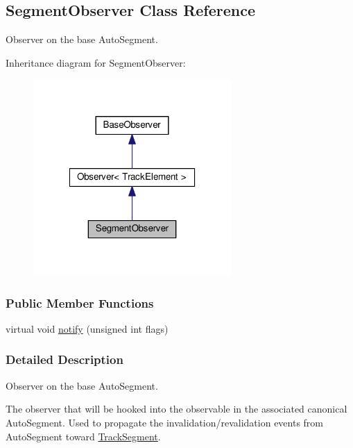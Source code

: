 \hypertarget{classKite_1_1SegmentObserver}{}\subsection{Segment\+Observer Class Reference}
\label{classKite_1_1SegmentObserver}


Observer on the base Auto\+Segment.  




Inheritance diagram for Segment\+Observer\+:\nopagebreak
\begin{figure}[H]
\begin{center}
\leavevmode
\includegraphics[width=214pt]{classKite_1_1SegmentObserver__inherit__graph}
\end{center}
\end{figure}
\subsubsection*{Public Member Functions}
\begin{DoxyCompactItemize}
\item 
virtual void \hyperlink{classKite_1_1SegmentObserver_a52e577fb0c4f2e3650928334fb621c2f}{notify} (unsigned int flags)
\end{DoxyCompactItemize}


\subsubsection{Detailed Description}
Observer on the base Auto\+Segment. 

The observer that will be hooked into the observable in the associated canonical Auto\+Segment. Used to propagate the invalidation/revalidation events from Auto\+Segment toward \hyperlink{classKite_1_1TrackSegment}{Track\+Segment}.

